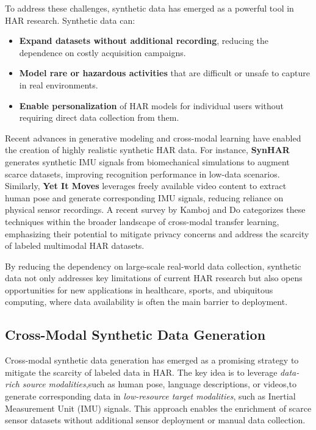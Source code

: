 To address these challenges, synthetic data has emerged as a powerful tool in HAR research. Synthetic data can:
\begin{itemize}
    \item \textbf{Expand datasets without additional recording}, reducing the dependence on costly acquisition campaigns.
    \item \textbf{Model rare or hazardous activities} that are difficult or unsafe to capture in real environments.
    \item \textbf{Enable personalization} of HAR models for individual users without requiring direct data collection from them.
\end{itemize}

Recent advances in generative modeling and cross-modal learning have enabled the creation of highly realistic synthetic HAR data. For instance, \textbf{SynHAR} \cite{uhlenberg2024synhar} generates synthetic IMU signals from biomechanical simulations to augment scarce datasets, improving recognition performance in low-data scenarios. Similarly, \textbf{Yet It Moves} \cite{rey2020yet} leverages freely available video content to extract human pose and generate corresponding IMU signals, reducing reliance on physical sensor recordings. A recent survey by Kamboj and Do \cite{kamboj2024survey} categorizes these techniques within the broader landscape of cross-modal transfer learning, emphasizing their potential to mitigate privacy concerns and address the scarcity of labeled multimodal HAR datasets.

By reducing the dependency on large-scale real-world data collection, synthetic data not only addresses key limitations of current HAR research but also opens opportunities for new applications in healthcare, sports, and ubiquitous computing, where data availability is often the main barrier to deployment.

\subsection{Cross-Modal Synthetic Data Generation}

Cross-modal synthetic data generation has emerged as a promising strategy to mitigate the scarcity of labeled data in HAR. The key idea is to leverage \textit{data-rich source modalities},such as human pose, language descriptions, or videos,to generate corresponding data in \textit{low-resource target modalities}, such as Inertial Measurement Unit (IMU) signals. This approach enables the enrichment of scarce sensor datasets without additional sensor deployment or manual data collection.

